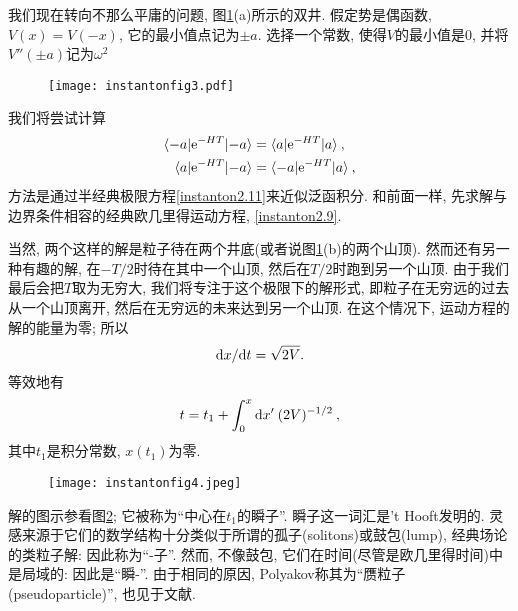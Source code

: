 我们现在转向不那么平庸的问题, 图\ref{instantonfig3}(a)所示的双井. 假定势是偶函数, $V(x)=V(-x)$, 它的最小值点记为$\pm a$. 选择一个常数, 使得$V$的最小值是0, 并将$V''(\pm a)$记为$\omega^{2}$
\begin{figure}[h]
    \centering
    \texttt{[image: instantonfig3.pdf]}
    \caption{ \label{instantonfig3}}
\end{figure}

我们将尝试计算
\begin{subequations}
    \begin{align}
        \langle {-}a \vert \mathrm{e}^{-HT} \vert {-}a \rangle &= \langle a \vert \mathrm{e}^{-HT} \vert a \rangle \:, \label{instanton2.19a}\\ 
        \langle a \vert \mathrm{e}^{-HT} \vert {-}a \rangle &= \langle {-}a \vert \mathrm{e}^{-HT} \vert a \rangle \:,\label{instanton2.19b}
    \end{align}
\end{subequations}
方法是通过半经典极限方程\eqref{instanton2.11}来近似泛函积分. 和前面一样, 先求解与边界条件相容的经典欧几里得运动方程, \eqref{instanton2.9}. 

当然, 两个这样的解是粒子待在两个井底(或者说图\ref{instantonfig3}(b)的两个山顶). 然而还有另一种有趣的解, 在$-T/2$时待在其中一个山顶, 然后在$T/2$时跑到另一个山顶.
由于我们最后会把$T$取为无穷大, 我们将专注于这个极限下的解形式, 即粒子在无穷远的过去从一个山顶离开, 然后在无穷远的未来达到另一个山顶. 在这个情况下, 运动方程的解的能量为零; 
所以
\begin{equation}
    \mathrm{d} x/\mathrm{d} t =\sqrt{2V}. \label{instanton2.20}
\end{equation}
等效地有
\begin{equation}
    t= t_{1}+\int_{0}^{x}\mathrm{d} x' \: (2V)^{-1/2} \:, \label{instanton2.21}
\end{equation}
其中$t_{1}$是积分常数, $x(t_{1})$为零.

\begin{figure}[h]
    \centering
    \texttt{[image: instantonfig4.jpeg]}
    \caption{ \label{instantonfig4}}
  \end{figure}

解的图示参看图\ref{instantonfig4}; 它被称为``中心在$t_{1}$的瞬子''. 瞬子这一词汇是't Hooft发明的. 灵感来源于它们的数学结构十分类似于所谓的孤子(solitons)或鼓包(lump), 
经典场论的类粒子解: 因此称为``-子''. 然而, 不像鼓包, 它们在时间(尽管是欧几里得时间)中是局域的: 因此是``瞬-''. 由于相同的原因, Polyakov称其为``赝粒子(pseudoparticle)'', 也见于文献.

